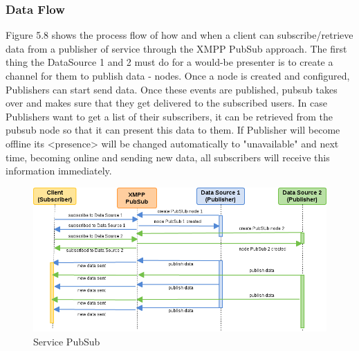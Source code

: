 \subsubsection{Data Flow}
Figure 5.8 shows the process flow of how and when a client can subscribe/retrieve data from a publisher of service through the XMPP PubSub approach. The first thing the DataSource 1 and 2 must do for a would-be presenter is to create a channel for them to publish data - nodes. Once a node is created and configured, Publishers can start send data. Once these events are published, pubsub takes over and makes sure that they get delivered to the subscribed users. In case Publishers want to get a list of their subscribers, it can be retrieved from the pubsub node so that it can present this data to them. If Publisher will become offline its <presence> will be changed automatically to "unavailable" and next time, becoming online and sending new data, all subscribers will receive this information immediately.
    \begin{figure}[!ht]
    \centering
    \includegraphics[scale=0.6]{images/PubSub.png}   
    \caption[Service PubSub]{Service PubSub}
    \label{img:pub_sub}                           
    \end{figure}

